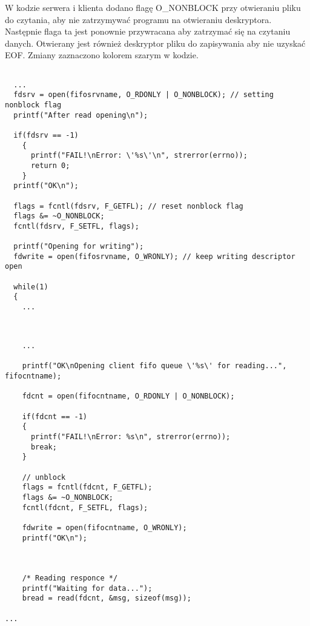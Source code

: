 \documentclass[a4paper,15pt]{article}
\begin{document}
W kodzie serwera i klienta dodano flagę O\_NONBLOCK przy otwieraniu pliku do czytania, aby nie zatrzymywać programu na otwieraniu deskryptora. Następnie flaga ta jest ponownie przywracana aby zatrzymać się na czytaniu danych. Otwierany jest również deskryptor pliku do zapisywania aby nie uzyskać EOF. Zmiany zaznaczono kolorem szarym w kodzie.


\begin{lstlisting}[style=CStyle, label=some-code, caption=srvfifo.c,
linebackgroundcolor={
	\ifnum\value{lstnumber}=3\color{gainsboro}\fi
	\ifnum\value{lstnumber}=13\color{gainsboro}\fi
	\ifnum\value{lstnumber}=14\color{gainsboro}\fi
	\ifnum\value{lstnumber}=15\color{gainsboro}\fi
	\ifnum\value{lstnumber}=18\color{gainsboro}\fi
	}
	]
	
  ... 
  fdsrv = open(fifosrvname, O_RDONLY | O_NONBLOCK); // setting nonblock flag 
  printf("After read opening\n");

  if(fdsrv == -1)
    {
      printf("FAIL!\nError: \'%s\'\n", strerror(errno));
      return 0;
    }
  printf("OK\n");

  flags = fcntl(fdsrv, F_GETFL); // reset nonblock flag
  flags &= ~O_NONBLOCK;
  fcntl(fdsrv, F_SETFL, flags);

  printf("Opening for writing");
  fdwrite = open(fifosrvname, O_WRONLY); // keep writing descriptor open

  while(1)
  {
  	...
	
\end{lstlisting}


\begin{lstlisting}[style=CStyle, label=some-code, caption=cntfifo.c,
linebackgroundcolor={
	\ifnum\value{lstnumber}=6\color{gainsboro}\fi
	\ifnum\value{lstnumber}=15\color{gainsboro}\fi
	\ifnum\value{lstnumber}=16\color{gainsboro}\fi
	\ifnum\value{lstnumber}=17\color{gainsboro}\fi
	\ifnum\value{lstnumber}=19\color{gainsboro}\fi
	}
	]

	...	

	printf("OK\nOpening client fifo queue \'%s\' for reading...", fifocntname);
      
    fdcnt = open(fifocntname, O_RDONLY | O_NONBLOCK);
      
    if(fdcnt == -1)
    {
      printf("FAIL!\nError: %s\n", strerror(errno));
      break;
    }

    // unblock 
    flags = fcntl(fdcnt, F_GETFL);
    flags &= ~O_NONBLOCK;
    fcntl(fdcnt, F_SETFL, flags);

    fdwrite = open(fifocntname, O_WRONLY);
    printf("OK\n");



    /* Reading responce */
    printf("Waiting for data...");
	bread = read(fdcnt, &msg, sizeof(msg));

...
\end{lstlisting}
\end{document}
